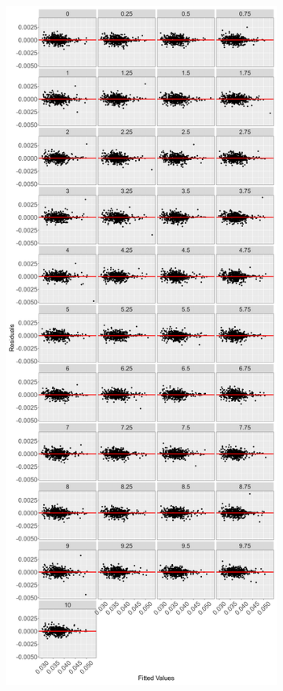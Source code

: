 \begin{figure}[!htbp]
    \centering
    \captionsetup{type=figure}
    \begin{subfigure}{0.49\textwidth}
        \centering
        \captionsetup{justification=centering}
        \includegraphics[width=\textwidth]{Figures/Model Checking/zero_coupon_yields_phase_3_HJM_2F_procedure_2_poly_model_fitted_vs_residual_plot.png}

\end{subfigure}
\end{figure}
